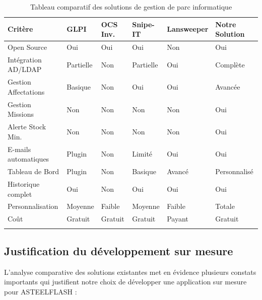\begin{longtable}{|m{2.5cm}|m{2cm}|m{2cm}|m{2cm}|m{2cm}|m{2cm}|}
\hline
\textbf{Critère} & \textbf{GLPI} & \textbf{OCS Inv.} & \textbf{Snipe-IT} & \textbf{Lansweeper} & \textbf{Notre Solution} \\
\hline
\endhead
\endfoot
\endlastfoot
\hline
Open Source & Oui & Oui & Oui & Non & Oui \\
\hline
Intégration AD/LDAP & Partielle & Non & Partielle & Oui & Complète \\
\hline
Gestion Affectations & Basique & Non & Oui & Oui & Avancée \\
\hline
Gestion Missions & Non & Non & Non & Non & Oui \\
\hline
Alerte Stock Min. & Non & Non & Non & Non & Oui \\
\hline
E-mails automatiques & Plugin & Non & Limité & Oui & Oui \\
\hline
Tableau de Bord & Plugin & Non & Basique & Avancé & Personnalisé \\
\hline
Historique complet & Oui & Non & Oui & Oui & Oui \\
\hline
Personnalisation & Moyenne & Faible & Moyenne & Faible & Totale \\
\hline
Coût & Gratuit & Gratuit & Gratuit & Payant & Gratuit \\
\hline
\captionsetup{justification=centering,margin=1cm}
\caption{Tableau comparatif des solutions de gestion de parc informatique}
\end{longtable}

\subsection{Justification du développement sur mesure}

L'analyse comparative des solutions existantes met en évidence plusieurs constats importants qui justifient notre choix de développer une application sur mesure pour ASTEELFLASH :

